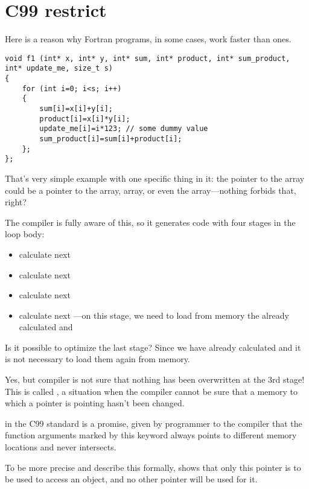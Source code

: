 \section{C99 restrict}

Here is a reason why Fortran programs, in some cases, work faster than \CCpp ones.

\begin{lstlisting}[style=customc]
void f1 (int* x, int* y, int* sum, int* product, int* sum_product, int* update_me, size_t s)
{
	for (int i=0; i<s; i++)
	{
		sum[i]=x[i]+y[i];
		product[i]=x[i]*y[i];
		update_me[i]=i*123; // some dummy value
		sum_product[i]=sum[i]+product[i];	
	};
};
\end{lstlisting}

That's very simple example with one specific
thing in it: 
the pointer to the  array could be
a pointer to the
 array,  array, or even the 
 array---nothing forbids that, right?

The compiler is fully aware of this, so it generates code with four stages in the loop body:
\begin{itemize}
\item calculate next 
\item calculate next 
\item calculate next 
\item calculate next ---on this stage, we need to load from memory
the already calculated  and 
\end{itemize}

Is it possible to optimize the last stage?
Since we have already calculated  and  
it is not necessary to load them again from memory.

Yes, but compiler is not sure that nothing has been overwritten at the 3rd stage!
This is called , 
a situation when the compiler cannot be sure that a memory to which a pointer is pointing hasn't been changed.

 in the C99 standard 
is a promise, given by programmer to the compiler that the function arguments 
marked by this keyword always points to different memory locations and never intersects.

To be more precise and describe this formally,  shows that only this pointer is to be used
to access an object, and no other pointer will be used for it.


